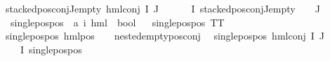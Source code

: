 \begin{isabellebody}
{\isachardoublequoteopen}stacked{\isacharunderscore}{\kern0pt}pos{\isacharunderscore}{\kern0pt}conj{\isacharunderscore}{\kern0pt}J{\isacharunderscore}{\kern0pt}empty\ {\isacharparenleft}{\kern0pt}hml{\isacharunderscore}{\kern0pt}conj\ I\ J\ {\isasymPhi}{\isacharparenright}{\kern0pt}{\isachardoublequoteclose}\isanewline
{}\ {\isachardoublequoteopen}{\isasymforall}{\isasymphi}\ {\isasymin}\ {\isacharparenleft}{\kern0pt}{\isasymPhi}\ {\isacharbackquote}{\kern0pt}\ I{\isacharparenright}{\kern0pt}{\isachardot}{\kern0pt}\ {\isacharparenleft}{\kern0pt}stacked{\isacharunderscore}{\kern0pt}pos{\isacharunderscore}{\kern0pt}conj{\isacharunderscore}{\kern0pt}J{\isacharunderscore}{\kern0pt}empty\ {\isasymphi}{\isacharparenright}{\kern0pt}{\isachardoublequoteclose}\ {\isachardoublequoteopen}{\isasymPhi}\ {\isacharbackquote}{\kern0pt}\ J\ {\isacharequal}{\kern0pt}\ {\isacharbraceleft}{\kern0pt}{\isacharbraceright}{\kern0pt}{\isachardoublequoteclose}\isanewline
\isanewline
{}\isamarkupfalse%
\ single{\isacharunderscore}{\kern0pt}pos{\isacharunderscore}{\kern0pt}pos\ {\isacharcolon}{\kern0pt}{\isacharcolon}{\kern0pt}\ {\isachardoublequoteopen}{\isacharparenleft}{\kern0pt}{\isacharprime}{\kern0pt}a{\isacharcomma}{\kern0pt}\ {\isacharprime}{\kern0pt}i{\isacharparenright}{\kern0pt}\ hml\ {\isasymRightarrow}\ bool{\isachardoublequoteclose}\isanewline
\ \ \isanewline
{\isachardoublequoteopen}single{\isacharunderscore}{\kern0pt}pos{\isacharunderscore}{\kern0pt}pos\ TT{\isachardoublequoteclose}\ {\isacharbar}{\kern0pt}\isanewline
{\isachardoublequoteopen}single{\isacharunderscore}{\kern0pt}pos{\isacharunderscore}{\kern0pt}pos\ {\isacharparenleft}{\kern0pt}hml{\isacharunderscore}{\kern0pt}pos\ {\isacharunderscore}{\kern0pt}\ {\isasympsi}{\isacharparenright}{\kern0pt}{\isachardoublequoteclose}\ \ {\isachardoublequoteopen}nested{\isacharunderscore}{\kern0pt}empty{\isacharunderscore}{\kern0pt}pos{\isacharunderscore}{\kern0pt}conj\ {\isasympsi}{\isachardoublequoteclose}\ {\isacharbar}{\kern0pt}\isanewline
{\isachardoublequoteopen}single{\isacharunderscore}{\kern0pt}pos{\isacharunderscore}{\kern0pt}pos\ {\isacharparenleft}{\kern0pt}hml{\isacharunderscore}{\kern0pt}conj\ I\ J\ {\isasymPhi}{\isacharparenright}{\kern0pt}{\isachardoublequoteclose}\ \ \isanewline
{\isachardoublequoteopen}{\isacharparenleft}{\kern0pt}{\isasymforall}{\isasymphi}\ {\isasymin}\ {\isacharparenleft}{\kern0pt}{\isasymPhi}\ {\isacharbackquote}{\kern0pt}I{\isacharparenright}{\kern0pt}{\isachardot}{\kern0pt}\ {\isacharparenleft}{\kern0pt}single{\isacharunderscore}{\kern0pt}pos{\isacharunderscore}{\kern0pt}pos\ {\isasymphi}{\isacharparenright}{\kern0pt}{\isacharparenright}{\kern0pt}{\isachardoublequoteclose}\isanewline

\end{isabellebody}
